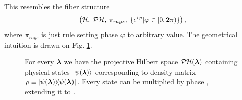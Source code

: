 This resembles the fiber structure
$$\left(\mathcal{H},\;\mathcal{P}\mathcal{H},\;\pi_{rays},\;\{e^{i\varphi}| \varphi\in[0,2\pi)\}\right),$$
where $\pi_{rays}$ is just rule setting phase $\varphi$ to arbitrary value. The geometrical intuition is drawn on Fig. \ref{fig:projectiveHilbertSpace}.



\begin{figure}[H]
    \centering
\caption{For every ${\bm\lambda}$ we have the projective Hilbert space $\mathcal{P}\mathcal{H}({\bm\lambda})$ containing physical states $\ket{\psi({\bm\lambda})}$ corresponding to density matrix $\rho\equiv\ket{\psi({\bm\lambda})}\!\!\bra{\psi({\bm\lambda})}$. Every state can be multiplied by phase , extending it to .}
    \label{fig:projectiveHilbertSpace}
\end{figure}







